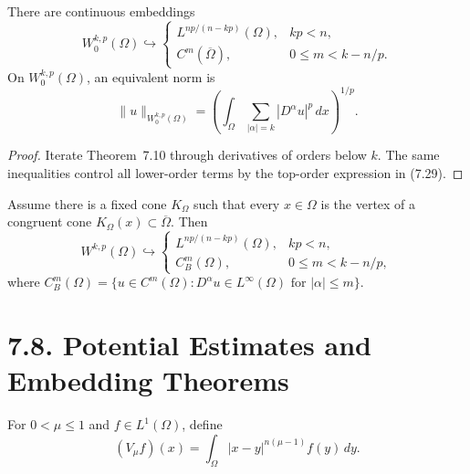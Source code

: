 \begin{corollary}
\label{gt:cor-sobolev-embedding-higher-order}
There are continuous embeddings
\[
W_0^{k,p}(\Omega)\hookrightarrow
\begin{cases}
L^{np/(n-kp)}(\Omega),&kp<n,\\
C^m(\overline\Omega),&0\leq m<k-n/p.
\end{cases}
\]
On $W_0^{k,p}(\Omega)$, an equivalent norm is
\begin{equation}
\tag{7.29}
\|u\|_{W_0^{k,p}(\Omega)}
=\left(\int_\Omega\sum_{|\alpha|=k}|D^\alpha u|^p\,dx\right)^{1/p}.
\end{equation}
\end{corollary}
\begin{proof}
\sketch Iterate Theorem~7.10 through derivatives of orders below $k$. The
same inequalities control all lower-order terms by the top-order expression
in (7.29).
\end{proof}

\begin{proposition}
\label{gt:prop-sobolev-cone-embedding}
Assume there is a fixed cone $K_\Omega$ such that every $x\in\Omega$ is the
vertex of a congruent cone $K_\Omega(x)\subset\overline\Omega$. Then
\[
W^{k,p}(\Omega)\hookrightarrow
\begin{cases}
L^{np/(n-kp)}(\Omega),&kp<n,\\
C_B^m(\Omega),&0\leq m<k-n/p,
\end{cases}
\]
where
$C_B^m(\Omega)=\{u\in C^m(\Omega):D^\alpha u\in L^\infty(\Omega)
\text{ for }|\alpha|\leq m\}$.
\end{proposition}

\section*{7.8. Potential Estimates and Embedding Theorems}
\label{gt:sec-potential-estimates}

\begin{definition}
\label{gt:def-sobolev-riesz-potential}
For $0<\mu\leq1$ and $f\in L^1(\Omega)$, define
\begin{equation}
\tag{7.31}
(V_\mu f)(x)=\int_\Omega |x-y|^{n(\mu-1)}f(y)\,dy.
\end{equation}
\end{definition}

